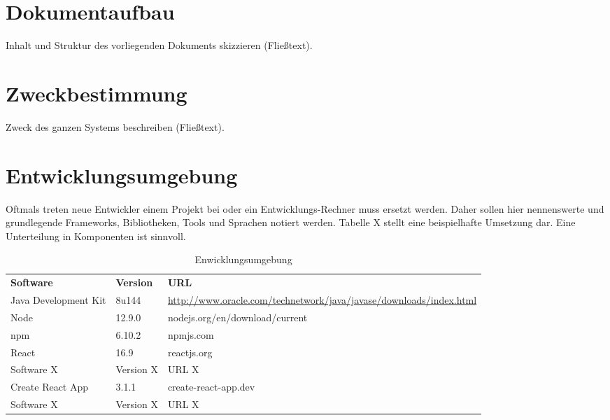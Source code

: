\section{Dokumentaufbau}\label{sec:dokumentaufbau}
\begin{tcolorbox}
	Inhalt und Struktur des vorliegenden Dokuments skizzieren (Fließtext).
\end{tcolorbox}

\section{Zweckbestimmung}\label{sec:zweckbestimmung}
\begin{tcolorbox}
	Zweck des ganzen Systems beschreiben (Fließtext).
\end{tcolorbox}

\section{Entwicklungsumgebung}\label{sec:entwicklungsumgebung}
\begin{tcolorbox}
	Oftmals treten neue Entwickler einem Projekt bei oder ein Entwicklungs-Rechner muss ersetzt werden.
	Daher sollen hier nennenswerte und grundlegende Frameworks, Bibliotheken, Tools und Sprachen notiert werden.
	Tabelle X stellt eine beispielhafte Umsetzung dar.
	Eine Unterteilung in Komponenten ist sinnvoll.
\end{tcolorbox}

\begin{table}[h]
	\centering
	\begin{tabularx}{\textwidth}{l l X}
		\rowcolor[HTML]{C0C0C0} 
		\textbf{Software} & \textbf{Version} & \textbf{URL} \\
		Java Development Kit & 8u144 & \url{http://www.oracle.com/technetwork/java/javase/downloads/index.html} \\
		\rowcolor[HTML]{E7E7E7} 
		Node & 12.9.0 & nodejs.org/en/download/current \\
		npm & 6.10.2 & npmjs.com \\
		\rowcolor[HTML]{E7E7E7} 
		React &16.9 &reactjs.org\\
		Software X & Version X & URL X \\
		\rowcolor[HTML]{E7E7E7} 
		Create React App & 3.1.1 & create-react-app.dev \\
		Software X & Version X & URL X \\
	\end{tabularx}
	\caption{Enwicklungsumgebung}
	\label{table:entwicklungsumgebung}
\end{table}